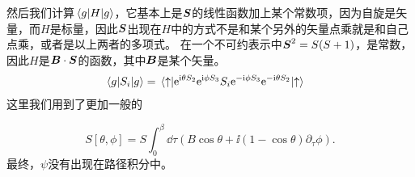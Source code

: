 然后我们计算$\mel*{g}{H}{g}$，它基本上是$\vb*{S}$的线性函数加上某个常数项，因为自旋是矢量，而$H$是标量，因此$\vb*{S}$出现在$H$中的方式不是和某个另外的矢量点乘就是和自己点乘，或者是以上两者的多项式。
在一个不可约表示中$\vb*{S}^2 = S(S+1)$，是常数，因此$H$是$\vb*{B} \cdot \vb*{S}$的函数，其中$\vb*{B}$是某个矢量。
\[
    \begin{aligned}
        \mel*{g}{S_i}{g} &= \mel*{\uparrow}{\mathrm{e}^{\mathrm{i} \theta S_2} \mathrm{e}^{\mathrm{i} \phi S_3} S_i \mathrm{e}^{- \mathrm{i} \phi S_3} \mathrm{e}^{- \mathrm{i} \theta S_2}}{\uparrow}
    \end{aligned}
\]
这里我们用到了更加一般的

\begin{equation}
    S[\theta, \phi] = S \int_0^\beta \dd{\tau} (B \cos \theta + \ii (1 - \cos \theta) \partial_\tau \phi).
\end{equation}
最终，$\psi$没有出现在路径积分中。

